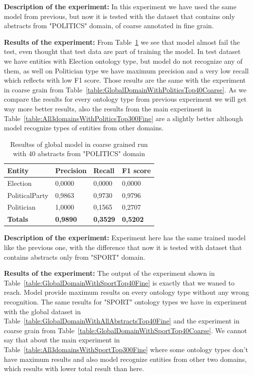\documentclass[thesis=M,english]{FITthesis}[2018/05/30]
\begin{document}
	\textbf{Description of the experiment:} In this experiment we have used the same model from previous, but now it is tested with the dataset that contains only abstracts from "POLITICS" domain, of coarse annotated in fine grain.

	\textbf{Results of the experiment:} From Table~\ref{table:GlobalDomainWithPoliticsTop40Fine} we see that model almost fail the test, even thought that test data are part of training the model. In test dataset we have entities with Election ontology type, but model do not recognize any of them, as well on Politician type we have maximum precision and a very low recall which reflects with low F1 score. Those results are the same with the experiment in coarse grain from Table~\ref{table:GlobalDomainWithPoliticsTop40Coarse}. As we compare the results for every ontology type from previous experiment we will get way more better results, also the results from the main experiment in Table~\ref{table:All3domainsWithPoliticsTop300Fine} are a slightly better although model recognize types of entities from other domains.    

	\begin{table}[H]\centering
		\begin{tabular}{|l|l|l|l|}
			\hline {\textbf{Entity}} & {\textbf{Precision}} & {\textbf{Recall}} & {\textbf{F1 score}}\\\hline
				Election & 0,0000 & 0,0000 & 0,0000\\
				PoliticalParty & 0,9863 & 0,9730 & 0,9796\\
				Politician & 1,0000 & 0,1565 & 0,2707\\\hline
				\textbf{Totals} & \textbf{0,9890} & \textbf{0,3529} & \textbf{0,5202}\\\hline
		\end{tabular}
		\caption{Resultss of global model in coarse grained run with 40 abstracts from "POLITICS" domain \label{table:GlobalDomainWithPoliticsTop40Fine}}
	\end{table}	


	\textbf{Description of the experiment:} Experiment here has the same trained model like the previous one, with the difference that now it is tested with dataset that contains abstracts only from "SPORT" domain.

	\textbf{Results of the experiment:} The output of the experiment shown in Table~\ref{table:GlobalDomainWithSportTop40Fine} is exactly that we waned to reach. Model provide maximum results on every ontology type without any wrong recognition. The same results for "SPORT" ontology types we have in experiment with the global dataset in Table~\ref{table:GlobalDomainWithAllAbstractsTop40Fine} and the experiment in coarse grain from Table~\ref{table:GlobalDomainWithSportTop40Coarse}. We cannot say that about the main experiment in Table~\ref{table:All3domainsWithSportTop300Fine} where some ontology types don't have maximum results and also model recognize entities from other two domains, which results with lower total result than here.
\end{document}
